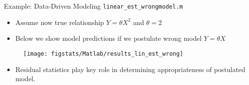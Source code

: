 \documentclass[handout,9pt]{beamer}
\begin{document}
%
\begin{frame}{Example: Data-Driven Modeling \footnotesize{\texttt{linear\_est\_wrongmodel.m}}}

\begin{block}{}
\begin{itemize}
\setlength{\itemsep}{5pt}
\item Assume now true relationship $Y=\theta X^2$ and $\theta=2$
\item Below we show model predictions if we postulate wrong model $Y=\theta X$
\end{itemize}
\end{block}

\begin{figure}[!htb]
    \centering
	\texttt{[image: figstats/Matlab/results\_lin\_est\_wrong]}
\end{figure}

\begin{itemize}
\item Residual statistics play key role in determining appropriateness of postulated model.
\end{itemize}

\end{frame}
\end{document}
